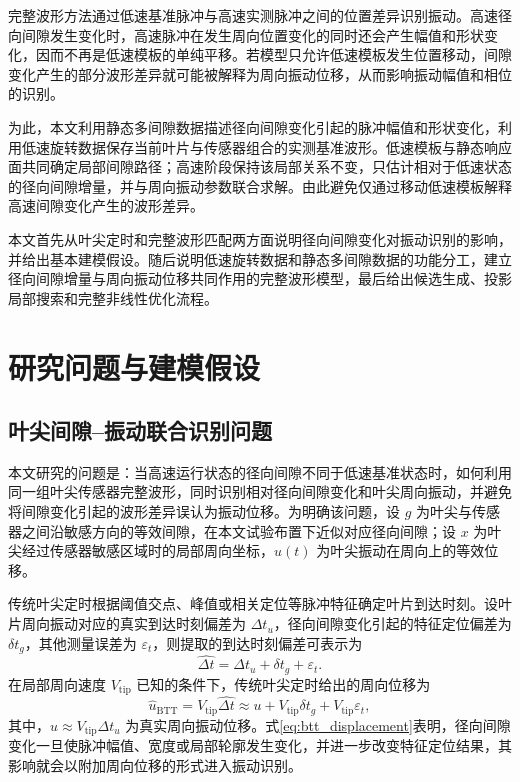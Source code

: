 \documentclass[UTF8,12pt,a4paper]{ctexart}
\begin{document}
完整波形方法通过低速基准脉冲与高速实测脉冲之间的位置差异识别振动。高速径向间隙发生变化时，高速脉冲在发生周向位置变化的同时还会产生幅值和形状变化，因而不再是低速模板的单纯平移。若模型只允许低速模板发生位置移动，间隙变化产生的部分波形差异就可能被解释为周向振动位移，从而影响振动幅值和相位的识别。

为此，本文利用静态多间隙数据描述径向间隙变化引起的脉冲幅值和形状变化，利用低速旋转数据保存当前叶片与传感器组合的实测基准波形。低速模板与静态响应面共同确定局部间隙路径；高速阶段保持该局部关系不变，只估计相对于低速状态的径向间隙增量，并与周向振动参数联合求解。由此避免仅通过移动低速模板解释高速间隙变化产生的波形差异。

本文首先从叶尖定时和完整波形匹配两方面说明径向间隙变化对振动识别的影响，并给出基本建模假设。随后说明低速旋转数据和静态多间隙数据的功能分工，建立径向间隙增量与周向振动位移共同作用的完整波形模型，最后给出候选生成、投影局部搜索和完整非线性优化流程。

\section{研究问题与建模假设}

\subsection{叶尖间隙--振动联合识别问题}

本文研究的问题是：当高速运行状态的径向间隙不同于低速基准状态时，如何利用同一组叶尖传感器完整波形，同时识别相对径向间隙变化和叶尖周向振动，并避免将间隙变化引起的波形差异误认为振动位移。为明确该问题，设 $g$ 为叶尖与传感器之间沿敏感方向的等效间隙，在本文试验布置下近似对应径向间隙；设 $x$ 为叶尖经过传感器敏感区域时的局部周向坐标，$u(t)$ 为叶尖振动在周向上的等效位移。

传统叶尖定时根据阈值交点、峰值或相关定位等脉冲特征确定叶片到达时刻。设叶片周向振动对应的真实到达时刻偏差为 $\Delta t_u$，径向间隙变化引起的特征定位偏差为 $\delta t_g$，其他测量误差为 $\varepsilon_t$，则提取的到达时刻偏差可表示为
\begin{equation}
\widehat{\Delta t}=\Delta t_u+\delta t_g+\varepsilon_t.
\label{eq:btt_time_error}
\end{equation}
在局部周向速度 $V_{\mathrm{tip}}$ 已知的条件下，传统叶尖定时给出的周向位移为
\begin{equation}
\widehat u_{\mathrm{BTT}}
=V_{\mathrm{tip}}\widehat{\Delta t}
\approx u+V_{\mathrm{tip}}\delta t_g+V_{\mathrm{tip}}\varepsilon_t,
\label{eq:btt_displacement}
\end{equation}
其中，$u\approx V_{\mathrm{tip}}\Delta t_u$ 为真实周向振动位移。式\eqref{eq:btt_displacement}表明，径向间隙变化一旦使脉冲幅值、宽度或局部轮廓发生变化，并进一步改变特征定位结果，其影响就会以附加周向位移的形式进入振动识别。
\end{document}
